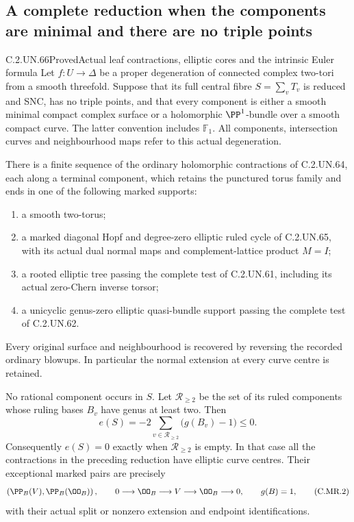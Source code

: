 \subsection{A complete reduction when the components are minimal and there are no triple points}

\begin{statement}{C.2.UN.66}{Proved}{Actual leaf contractions, elliptic cores and the intrinsic Euler formula}
Let $f:U\to\Delta$ be a proper degeneration of connected complex
two-tori from a smooth threefold. Suppose that its full central
fibre $S=\sum_vT_v$ is reduced and SNC, has no triple points,
and that every component is either a smooth minimal compact
complex surface or a holomorphic $\PP^1$-bundle over a smooth
compact curve. The latter convention includes $\mathbb F_1$.
All components, intersection curves and neighbourhood maps refer
to this actual degeneration.

There is a finite sequence of the ordinary holomorphic
contractions of C.2.UN.64, each along a terminal component, which
retains the punctured torus family and ends in one of the
following marked supports:
\begin{enumerate}
\item a smooth two-torus;
\item a marked diagonal Hopf and degree-zero elliptic ruled
cycle of C.2.UN.65, with its actual dual normal maps and
complement-lattice product $M=I$;
\item a rooted elliptic tree passing the complete test of
C.2.UN.61, including its actual zero-Chern inverse torsor;
\item a unicyclic genus-zero elliptic quasi-bundle support
passing the complete test of C.2.UN.62.
\end{enumerate}
Every original surface and neighbourhood is recovered by
reversing the recorded ordinary blowups. In particular the
normal extension at every curve centre is retained.

No rational component occurs in $S$. Let $\mathcal R_{\ge2}$
be the set of its ruled components whose ruling bases $B_v$
have genus at least two. Then
\[
 e(S)=-2\sum_{v\in\mathcal R_{\ge2}}\bigl(g(B_v)-1\bigr)
                                                        \le0.
\tag{C.MR.1}
\]
Consequently $e(S)=0$ exactly when $\mathcal R_{\ge2}$ is
empty. In that case all the contractions in the preceding
reduction have elliptic curve centres. Their exceptional
marked pairs are precisely
\[
 \left(\PP_B(V),\PP_B(\OO_B)\right),
 \qquad
 0\longrightarrow\OO_B\longrightarrow V
             \longrightarrow\OO_B\longrightarrow0,
 \qquad g(B)=1,
\tag{C.MR.2}
\]
with their actual split or nonzero extension and endpoint
identifications.


\end{statement}
